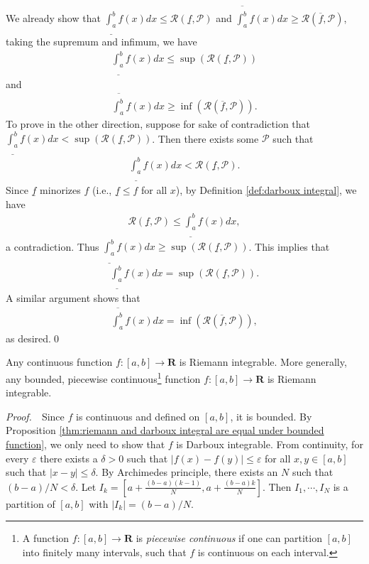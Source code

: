 \documentclass{book}
\theoremstyle{defstyle}
\theoremstyle{thmstyle}
\newcommand{\pff}{\noindent\emph{Proof.}~~}
\newcounter{Proposition}[section]
\begin{document}
We already show that $\underline{\int_{a}^{b}}f(x)dx \leq \mathcal{R}(\underline{f}, \mathcal{P})$ and $\overline{\int_{a}^{b}}f(x)dx \geq \mathcal{R}(\overline{f}, \mathcal{P})$, taking the supremum and infimum, we have
    \begin{align*}
        \underline{\int_{a}^{b}}f(x)dx \leq \sup(\mathcal{R}(\underline{f}, \mathcal{P}))
    \end{align*}
and
    \begin{align*}
        \overline{\int_{a}^{b}}f(x)dx \geq \inf(\mathcal{R}(\overline{f}, \mathcal{P})).
    \end{align*}
To prove in the other direction, suppose for sake of contradiction that  $\underline{\int_{a}^{b}}f(x)dx < \sup(\mathcal{R}(\underline{f}, \mathcal{P}))$. Then there exists some $\mathcal{P}$ such that
    \begin{align*}
        \underline{\int_{a}^{b}}f(x)dx
        < \mathcal{R}(\underline{f}, \mathcal{P}).
    \end{align*}
Since $\underline{f}$ minorizes $f$ (i.e., $\underline{f} \leq f$ for all $x$), by Definition \ref{def:darboux integral}, we have
    \begin{align*}
        \mathcal{R}(\underline{f}, \mathcal{P})
        \leq \underline{\int_{a}^{b}}f(x)dx,
    \end{align*}
a contradiction. Thus $\underline{\int_{a}^{b}}f(x)dx \geq \sup(\mathcal{R}(\underline{f}, \mathcal{P}))$. This implies that
    \begin{align*}
        \underline{\int_{a}^{b}}f(x)dx = \sup(\mathcal{R}(\underline{f}, \mathcal{P})).
    \end{align*}
A similar argument shows that
    \begin{align*}
        \overline{\int_{a}^{b}}f(x)dx = \inf(\mathcal{R}(\overline{f}, \mathcal{P})),
    \end{align*}
as desired.\qed


\begin{proposition}\label{thm:continuous function is riemann integrable}
    Any continuous function $f : [a, b] \to \mathbf{R}$ is Riemann integrable. More generally, any bounded, piecewise continuous\footnote{A function $f : [a, b] \to \mathbf{R}$ is \emph{piecewise continuous} if one can partition $[a, b]$ into finitely many intervals, such that $f$ is continuous on each interval.} function $f : [a, b] \to \mathbf{R}$ is Riemann integrable.
\end{proposition}

\pff Since $f$ is continuous and defined on $[a, b]$, it is bounded. By Proposition \ref{thm:riemann and darboux integral are equal under bounded function}, we only need to show that $f$ is Darboux integrable. From continuity, for every $\varepsilon$ there exists a $\delta > 0$ such that $|f(x) - f(y)| \leq \varepsilon$ for all $x, y \in [a, b]$ such that $|x - y| \leq \delta$. By Archimedes principle, there exists an $N$ such that $(b - a)/N < \delta$. Let $I_k = [a + \frac{(b - a)(k - 1)}{N}, a + \frac{(b - a)k}{N}]$. Then $I_1, \cdots, I_N$ is a partition of $[a, b]$ with $|I_k| = (b - a)/N$.
\end{document}

